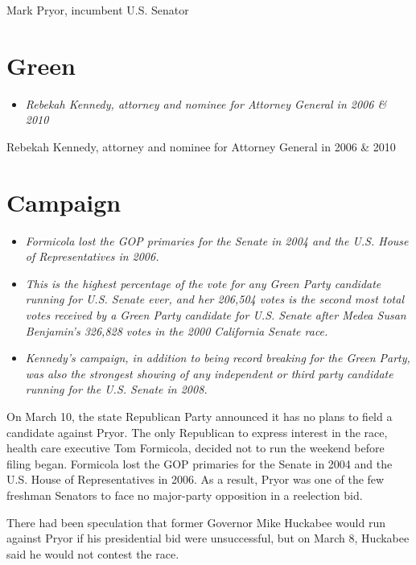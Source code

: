 Mark Pryor, incumbent U.S. Senator

\section{Green}\label{green}

\begin{itemize}
\item
  \emph{Rebekah Kennedy, attorney and nominee for Attorney General in
  2006 \& 2010}
\end{itemize}

Rebekah Kennedy, attorney and nominee for Attorney General in 2006 \&
2010

\section{Campaign}\label{campaign}

\begin{itemize}
\item
  \emph{Formicola lost the GOP primaries for the Senate in 2004 and the
  U.S. House of Representatives in 2006.}
\item
  \emph{This is the highest percentage of the vote for any Green Party
  candidate running for U.S. Senate ever, and her 206,504 votes is the
  second most total votes received by a Green Party candidate for U.S.
  Senate after Medea Susan Benjamin's 326,828 votes in the 2000
  California Senate race.}
\item
  \emph{Kennedy's campaign, in addition to being record breaking for the
  Green Party, was also the strongest showing of any independent or
  third party candidate running for the U.S. Senate in 2008.}
\end{itemize}

On March 10, the state Republican Party announced it has no plans to
field a candidate against Pryor. The only Republican to express interest
in the race, health care executive Tom Formicola, decided not to run the
weekend before filing began. Formicola lost the GOP primaries for the
Senate in 2004 and the U.S. House of Representatives in 2006. As a
result, Pryor was one of the few freshman Senators to face no
major-party opposition in a reelection bid.

There had been speculation that former Governor Mike Huckabee would run
against Pryor if his presidential bid were unsuccessful, but on March 8,
Huckabee said he would not contest the race.


